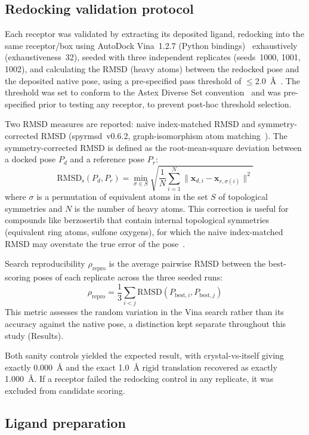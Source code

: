 \documentclass[global,twocolumn]{svjour}
\begin{document}
\subsection{Redocking validation protocol}

Each receptor was validated by extracting its deposited ligand, redocking
into the same receptor/box using AutoDock Vina~1.2.7 (Python
bindings)~\cite{trott2010} exhaustively (exhaustiveness~32), seeded with
three independent replicates (seeds~1000, 1001, 1002), and calculating the
RMSD (heavy atoms) between the redocked pose and the deposited native pose,
using a pre-specified pass threshold of $\le$2.0~\AA{}~\cite{hartshorn2007}.
The threshold was set to conform to the Astex Diverse Set
convention~\cite{hartshorn2007} and was pre-specified prior to testing any
receptor, to prevent post-hoc threshold selection.

Two RMSD measures are reported: naive index-matched RMSD and
symmetry-corrected RMSD (spyrmsd~v0.6.2, graph-isomorphism atom
matching~\cite{meli2020}). The symmetry-corrected RMSD is defined as the
root-mean-square deviation between a docked pose $P_d$ and a reference pose
$P_r$:
\[
\mathrm{RMSD_s}(P_d, P_r) = \min_{\sigma \in S} \sqrt{\frac{1}{N}
\sum_{i=1}^{N} \| \mathbf{x}_{d,i} - \mathbf{x}_{r,\sigma(i)} \|^2 }
\]
where $\sigma$ is a permutation of equivalent atoms in the set $S$ of
topological symmetries and $N$ is the number of heavy atoms. This
correction is useful for compounds like berzosertib that contain internal
topological symmetries (equivalent ring atoms, sulfone oxygens), for which
the naive index-matched RMSD may overstate the true error of the
pose~\cite{meli2020}.

Search reproducibility $\rho_{\text{repro}}$ is the average pairwise RMSD
between the best-scoring poses of each replicate across the three seeded
runs:
\[
\rho_{\text{repro}} = \frac{1}{3} \sum_{i < j} \mathrm{RMSD}(P_{\text{best},i},
P_{\text{best},j})
\]
This metric assesses the random variation in the Vina search rather than
its accuracy against the native pose, a distinction kept separate
throughout this study (Results).

Both sanity controls yielded the expected result, with crystal-vs-itself
giving exactly 0.000~\AA{} and the exact 1.0~\AA{} rigid translation
recovered as exactly 1.000~\AA{}. If a receptor failed the redocking
control in any replicate, it was excluded from candidate scoring.

\subsection{Ligand preparation}
\end{document}
